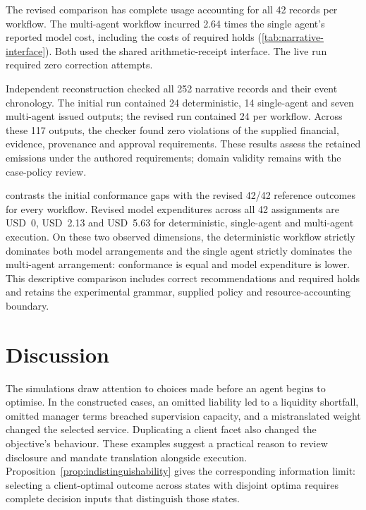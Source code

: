 \documentclass[oneside,10pt,english]{swissi}
\begin{document}


The revised comparison has complete usage accounting for all 42 records per workflow. The multi-agent workflow incurred 2.64 times the single agent's reported model cost, including the costs of required holds (\cref{tab:narrative-interface}). Both used the shared arithmetic-receipt interface. The live run required zero correction attempts.

Independent reconstruction checked all 252 narrative records and their event chronology. The initial run contained 24 deterministic, 14 single-agent and seven multi-agent issued outputs; the revised run contained 24 per workflow. Across these 117 outputs, the checker found zero violations of the supplied financial, evidence, provenance and approval requirements. These results assess the retained emissions under the authored requirements; domain validity remains with the case-policy review.

 contrasts the initial conformance gaps with the revised 42/42 reference outcomes for every workflow. Revised model expenditures across all 42 assignments are USD~0, USD~2.13 and USD~5.63 for deterministic, single-agent and multi-agent execution. On these two observed dimensions, the deterministic workflow strictly dominates both model arrangements and the single agent strictly dominates the multi-agent arrangement: conformance is equal and model expenditure is lower. This descriptive comparison includes correct recommendations and required holds and retains the experimental grammar, supplied policy and resource-accounting boundary.



\section{Discussion}\label{sec:discussion}

The simulations draw attention to choices made before an agent begins to optimise. In the constructed cases, an omitted liability led to a liquidity shortfall, omitted manager terms breached supervision capacity, and a mistranslated weight changed the selected service. Duplicating a client facet also changed the objective's behaviour. These examples suggest a practical reason to review disclosure and mandate translation alongside execution. Proposition~\ref{prop:indistinguishability} gives the corresponding information limit: selecting a client-optimal outcome across states with disjoint optima requires complete decision inputs that distinguish those states.
\end{document}
